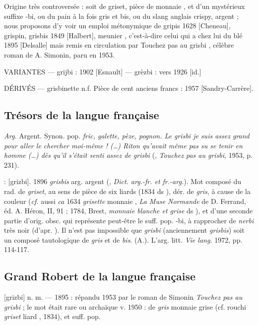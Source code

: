 Origine très controversée : soit de griset, \og pièce de monnaie \fg, et d'un
mystérieux suffixe -bi, ou du pain à la fois gris et bis, ou du slang anglais
crispy, argent ; nous proposons d'y voir un emploi métonymique de gripis 1628
[Cheneau], grispin, grisbis 1849 [Halbert], \og meunier \fg{}, c'est-à-dire \og celui qui a chez lui du blé \fg{} 1895 [Delsalle] mais remis en circulation par \og Touchez pas au grisbi \fg{}, célèbre roman de A. Simonin, paru en 1953.

VARIANTES ---  grijbi : 1902 [Esnault] --- grèzbi : vers 1926 [id.]

DÉRIVÉS --- grisbinette n.f. Pièce de cent anciens francs : 1957
[Sandry-Carrère].


\subsection*{Trésors de la langue française}

\emph{Arg.} Argent. Synon. pop. \emph{fric, galette, pèze, pognon. Le grisbi je suis assez grand pour aller le chercher moi-même ! (\ldots) Riton qu'avait même pas su se tenir en homme (\ldots) dès qu'il s'était senti assez de grisbi} (, \emph{Touchez pas au grisbi}, 1953, p. 231).

 : [grizbi].   1896 \emph{grisbis}
arg. \og argent \fg{} (, \emph{Dict. arg.-fr. et fr.-arg.}). Mot composé du rad. de \emph{griset}, au sens de \og pièce de six liards \fg{} (1834 ds ), dér. de \emph{gris}, à cause de la couleur (\emph{cf.} aussi \emph{ca} 1634 \emph{grisette} \og monnaie \fg{}, \emph{La Muse Normande} de D. Ferrand, éd. A. Héron, II, 91 ; 1784, Brest, \emph{monnaie blanche et grise} ds ), et d'une seconde partie d'orig. obsc. qui représente peut-être le suff. pop. -bi, à rapprocher de \emph{nerbi} \og très noir \fg{} (d'apr. ). Il n'est pas impossible que \emph{grisbi} (anciennement \emph{grisbis}) soit un composé tautologique de \emph{gris} et de \emph{bis}.
  (A.). L'arg. litt. \emph{Vie lang.} 1972, pp. 114-117.


\subsection*{Grand Robert de la langue française}

[grizbi] n. m. --- 1895 : répandu 1953 par le roman de Simonin \emph{Touchez pas au grisbi} ; le mot était rare ou archaïque v. 1950 : de \emph{gris} \og monnaie grise \fg{} (cf. rouchi \emph{griset} \og liard \fg{}, 1834), et suff. pop.

